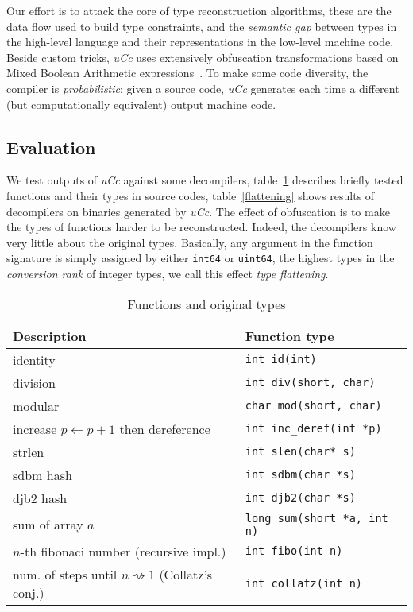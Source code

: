 \documentclass[a4paper]{llncs}
\begin{document}
Our effort is to attack the core of type reconstruction algorithms,
these are the data flow used to build type constraints, and the \emph{semantic gap} between types in the high-level language and their
representations in the low-level machine code.
Beside custom tricks, \emph{uCc} uses extensively
obfuscation transformations based on Mixed Boolean Arithmetic expressions~\cite{eyrolles_obfuscation_2017,zhou_information_2007}.
To make some code diversity, the compiler is \emph{probabilistic}: given a source
code, \emph{uCc} generates each time a different (but computationally equivalent) output machine code.

\subsection*{Evaluation}
We test outputs of \emph{uCc} against some decompilers, table~\ref{description} describes briefly
tested functions and their types in source codes, table~\ref{flattening} shows results of
decompilers on binaries generated by \emph{uCc}. The effect of obfuscation is to make the types
of functions harder to be reconstructed. Indeed, the decompilers know very little about the original
types. Basically, any argument in the function signature is simply assigned by either \texttt{int64}
or \texttt{uint64}, the highest types in the \emph{conversion rank} of integer types, we call this
effect \emph{type flattening}.

\begin{table}
	\begin{center}
		\caption{Functions and original types}\label{description}
		\begin{tabular}{|l|l|}
			\hline
			Description & Function type \\
			\hline
			identity & \texttt{int id(int)} \\
			\hline
			division & \texttt{int div(short, char)} \\
			\hline
			modular & \texttt{char mod(short, char)} \\
			\hline
			increase $p \leftarrow p + 1$ then dereference & \texttt{int inc\_deref(int *p)} \\
			\hline
			strlen  & \texttt{int slen(char* s)} \\
			\hline
			sdbm hash & \texttt{int sdbm(char *s)} \\
			\hline
			djb2 hash & \texttt{int djb2(char *s)} \\
			\hline
			sum of array $a$ & \texttt{long sum(short *a, int n)} \\
			\hline
			$n$-th fibonaci number (recursive impl.) & \texttt{int fibo(int n)} \\
			\hline
			num. of steps until $n \rightsquigarrow 1$ (Collatz's conj.)  & \texttt{int collatz(int n)} \\
			\hline
		\end{tabular}
	\end{center}
\end{table}
\end{document}
